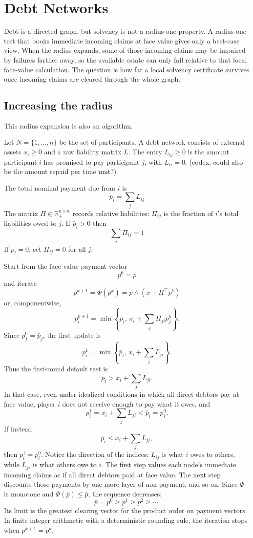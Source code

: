 \documentclass[11pt,oneside]{article}
\newcommand{\R}{\mathbb{R}}
\newcommand{\barp}{\bar p}
\begin{document}
\section{Debt Networks}

Debt is a directed graph, but solvency is not a radius-one property. A
radius-one test that books immediate incoming claims at face value gives only a
best-case view. When the radius expands, some of those incoming claims may be
impaired by failures farther away, so the available estate can only fall
relative to that local face-value calculation. The question is how far a local
solvency certificate survives once incoming claims are cleared through the
whole graph.

\subsection{Increasing the radius}

This radius expansion is also an algorithm. 

Let $N=\{1,\ldots,n\}$ be the set of participants. A debt network consists of
external assets $x_i\geq0$ and a raw liability matrix $L$. The entry
$L_{ij}\geq0$ is the amount participant $i$ has promised to pay participant
$j$, with $L_{ii}=0$. (codex: could also be the amount repaid per time unit?)


The total nominal payment due from $i$ is
\[
  \barp_i=\sum_j L_{ij}
\]
The matrix $\Pi \in \R_+^{n \times n}$ records relative liabilities:
$\Pi_{ij}$ is the fraction of $i$'s total liabilities owed to $j$. If
$\barp_i>0$ then
\[
  \sum_j \Pi_{ij}=1
\]
If $\barp_i=0$, set $\Pi_{ij}=0$ for all $j$.


Start from the face-value payment vector
\[
  p^0=\barp
\]
and iterate
\[
  p^{k+1}=\Phi(p^k)=\barp\wedge(x+\Pi^\top p^k)
\]
or, componentwise,
\[
  p_i^{k+1}
  =
  \min\left\{
    \barp_i,\,
    x_i+\sum_j\Pi_{ji}p_j^k
  \right\}.
\]
Since $p^0_j=\barp_j$, the first update is
\[
  p_i^1
  =
  \min\left\{
    \barp_i,\,
    x_i+\sum_j L_{ji}
  \right\}.
\]
Thus the first-round default test is
\[
  \barp_i>x_i+\sum_jL_{ji}.
\]
In that case, even under idealized conditions in which all direct debtors pay
at face value, player $i$ does not receive enough to pay what it owes, and
\[
  p_i^1=x_i+\sum_jL_{ji}<\barp_i=p_i^0.
\]
If instead
\[
  \barp_i\leq x_i+\sum_jL_{ji},
\]
then $p_i^1=p_i^0$. Notice the direction of the indices: $L_{ij}$ is what
$i$ owes to others, while $L_{ji}$ is what others owe to $i$.
The first step values each node's immediate incoming claims as if all direct
debtors paid at face value. The next step discounts those payments by one more
layer of non-payment, and so on. Since $\Phi$ is monotone and
$\Phi(\barp)\leq\barp$, the sequence decreases:
\[
  \barp=p^0\geq p^1\geq p^2\geq\cdots.
\]
Its limit is the greatest clearing vector for the product order on payment
vectors. In finite integer arithmetic with a deterministic rounding rule, the
iteration stops when $p^{k+1}=p^k$.
\end{document}
